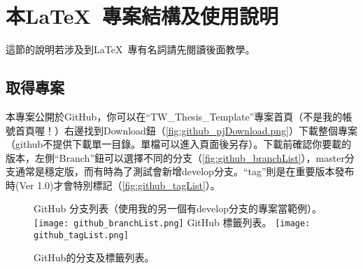 \documentclass[class=NCU_thesis, crop=false, float=true]{standalone}
\begin{document}
\section{本\LaTeX\ 專案結構及使用說明}
這節的說明若涉及到\LaTeX\ 專有名詞請先閱讀後面教學。
\subsection{取得專案}
本專案公開於GitHub，你可以在``TW\_Thesis\_Template''專案首頁\cite{_sppmg/tw_thesis_template_????}（不是我的帳號首頁喔！）右邊找到Download鈕（\cref{fig:github_pjDownload.png}）下載整個專案（github不提供下載單一目錄。單檔可以進入頁面後另存）。下載前確認你要載的版本，左側``Branch''鈕可以選擇不同的分支（\cref{fig:github_branchList}），master分支通常是穩定版，而有時為了測試會新增develop分支。``tag''則是在重要版本發布時(Ver 1.0)才會特別標記（\cref{fig:github_tagList}）。
\begin{figure}
    \centering
    \subcaptionbox
        {GitHub 分支列表（使用我的另一個有develop分支的專案當範例）。
        \label{fig:github_branchList}}
        {\texttt{[image: github\_branchList.png]}}
    \hspace{3em}
    \subcaptionbox
        {GitHub 標籤列表。
        \label{fig:github_tagList}}
        {\texttt{[image: github\_tagList.png]}}
    \caption{GitHub的分支及標籤列表。}
    \label{fig:github_branch_tagList}
\end{figure}
\end{document}
